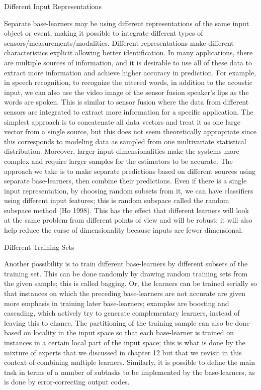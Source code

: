 Different Input Representations

Separate base-learners may be using different representations of the same input object or event, making it possible to integrate different types of sensors/measurements/modalities. Different representations make different characteristics explicit allowing better identification. In many applications, there are multiple sources of information, and it is desirable to use all of these data to extract more information and achieve higher accuracy in prediction. For example, in speech recognition, to recognize the uttered words, in addition to the acoustic input, we can also use the video image of the sensor fusion speaker’s lips as the words are spoken. This is similar to sensor fusion where the data from different sensors are integrated to extract more information for a specific application. The simplest approach is to concatenate all data vectors and treat it as one large vector from a single source, but this does not seem theoretically appropriate since this corresponds to modeling data as sampled from one multivariate statistical distribution. Moreover, larger input dimensionalities make the systems more complex and require larger samples for the estimators to be accurate. The approach we take is to make separate predictions based on different sources using separate base-learners, then combine their predictions. Even if there is a single input representation, by choosing random subsets from it, we can have classifiers using different input features; this is random subspace called the random subspace method (Ho 1998). This has the effect that different learners will look at the same problem from different points of view and will be robust; it will also help reduce the curse of dimensionality because inputs are fewer dimensional.

Different Training Sets

Another possibility is to train different base-learners by different subsets of the training set. This can be done randomly by drawing random training sets from the given sample; this is called bagging. Or, the learners can be trained serially so that instances on which the preceding base-learners are not accurate are given more emphasis in training later base-learners; examples are boosting and cascading, which actively try to generate complementary learners, instead of leaving this to chance. The partitioning of the training sample can also be done based on locality in the input space so that each base-learner is trained on instances in a certain local part of the input space; this is what is done by the mixture of experts that we discussed in chapter 12 but that we revisit in this context of combining multiple learners. Similarly, it is possible to define the main task in terms of a number of subtasks to be implemented by the base-learners, as is done by error-correcting output codes.

